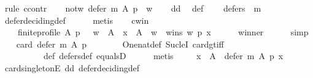\begin{isabellebody}
%
\isatagproof
{}\isamarkupfalse%
\ {\isacharparenleft}{\kern0pt}rule\ ccontr{\isacharparenright}{\kern0pt}\isanewline
\ \ \isamarkupfalse%
\ not{\isacharunderscore}{\kern0pt}w{\isacharcolon}{\kern0pt}\ {\isachardoublequoteopen}defer\ m\ A\ p\ {\isasymnoteq}\ {\isacharbraceleft}{\kern0pt}w{\isacharbraceright}{\kern0pt}{\isachardoublequoteclose}\isanewline
\ \ \isamarkupfalse%
\ dd\ \isamarkupfalse%
\ def{\isacharunderscore}{\kern0pt}{}{\isacharcolon}{\kern0pt}\isanewline
\ \ \ \ {\isachardoublequoteopen}defers\ {}\ m{\isachardoublequoteclose}\isanewline
\ \ \ \ \isamarkupfalse%
\ defer{\isacharunderscore}{\kern0pt}deciding{\isacharunderscore}{\kern0pt}def\isanewline
\ \ \ \ \isamarkupfalse%
\ metis\isanewline
\ \ \isamarkupfalse%
\ c{\isacharunderscore}{\kern0pt}win{\isacharcolon}{\kern0pt}\isanewline
\ \ \ \ {\isachardoublequoteopen}finite{\isacharunderscore}{\kern0pt}profile\ A\ p\ {\isasymand}\ \ w\ {\isasymin}\ A\ {\isasymand}\ {\isacharparenleft}{\kern0pt}{\isasymforall}x\ {\isasymin}\ A\ {\isacharminus}{\kern0pt}\ {\isacharbraceleft}{\kern0pt}w{\isacharbraceright}{\kern0pt}\ {\isachardot}{\kern0pt}\ wins\ w\ p\ x{\isacharparenright}{\kern0pt}{\isachardoublequoteclose}\isanewline
\ \ \ \ \isamarkupfalse%
\ winner\isanewline
\ \ \ \ \isamarkupfalse%
\ simp\isanewline
\ \ \isamarkupfalse%
\ {\isachardoublequoteopen}card\ {\isacharparenleft}{\kern0pt}defer\ m\ A\ p{\isacharparenright}{\kern0pt}\ {\isacharequal}{\kern0pt}\ {}{\isachardoublequoteclose}\isanewline
\ \ \ \ \isamarkupfalse%
\ One{\isacharunderscore}{\kern0pt}nat{\isacharunderscore}{\kern0pt}def\ Suc{\isacharunderscore}{\kern0pt}leI\ card{\isacharunderscore}{\kern0pt}gt{\isacharunderscore}{\kern0pt}{}{\isacharunderscore}{\kern0pt}iff\isanewline
\ \ \ \ \ \ \ \ \ \ def{\isacharunderscore}{\kern0pt}{}\ defers{\isacharunderscore}{\kern0pt}def\ equals{}D\isanewline
\ \ \ \ \isamarkupfalse%
\ metis\isanewline
\ \ \isamarkupfalse%
\ {}{\isacharcolon}{\kern0pt}\ {\isachardoublequoteopen}{\isasymexists}x\ {\isasymin}\ A\ {\isachardot}{\kern0pt}\ defer\ m\ A\ p\ {\isacharequal}{\kern0pt}{\isacharbraceleft}{\kern0pt}x{\isacharbraceright}{\kern0pt}{\isachardoublequoteclose}\isanewline
\ \ \ \ \isamarkupfalse%
\ card{\isacharunderscore}{\kern0pt}{}{\isacharunderscore}{\kern0pt}singletonE\ dd\ defer{\isacharunderscore}{\kern0pt}deciding{\isacharunderscore}{\kern0pt}def\isanewline

\end{isabellebody}
